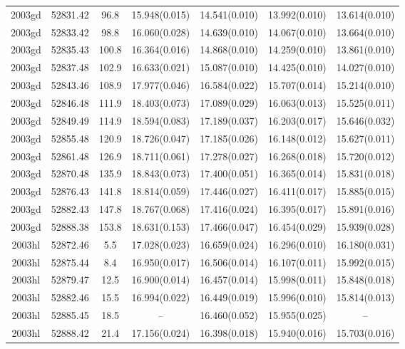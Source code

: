 \begin{table*}
\begin{tabular}{ccccccc}
2003gd	  & 52831.42	 & 96.8	& 15.948(0.015)	 & 14.541(0.010)	 & 13.992(0.010)	 & 13.614(0.010) \\ 
2003gd	  & 52833.42	 & 98.8	& 16.060(0.028)	 & 14.639(0.010)	 & 14.067(0.010)	 & 13.664(0.010) \\ 
2003gd	  & 52835.43	 & 100.8	& 16.364(0.016)	 & 14.868(0.010)	 & 14.259(0.010)	 & 13.861(0.010) \\ 
2003gd	  & 52837.48	 & 102.9	& 16.633(0.021)	 & 15.087(0.010)	 & 14.425(0.010)	 & 14.027(0.010) \\ 
2003gd	  & 52843.46	 & 108.9	& 17.977(0.046)	 & 16.584(0.022)	 & 15.707(0.014)	 & 15.214(0.010) \\ 
2003gd	  & 52846.48	 & 111.9	& 18.403(0.073)	 & 17.089(0.029)	 & 16.063(0.013)	 & 15.525(0.011) \\ 
2003gd	  & 52849.49	 & 114.9	& 18.594(0.083)	 & 17.189(0.037)	 & 16.203(0.017)	 & 15.646(0.032) \\ 
2003gd	  & 52855.48	 & 120.9	& 18.726(0.047)	 & 17.185(0.026)	 & 16.148(0.012)	 & 15.627(0.011) \\ 
2003gd	  & 52861.48	 & 126.9	& 18.711(0.061)	 & 17.278(0.027)	 & 16.268(0.018)	 & 15.720(0.012) \\ 
2003gd	  & 52870.48	 & 135.9	& 18.843(0.073)	 & 17.400(0.051)	 & 16.365(0.014)	 & 15.831(0.018) \\ 
2003gd	  & 52876.43	 & 141.8	& 18.814(0.059)	 & 17.446(0.027)	 & 16.411(0.017)	 & 15.885(0.015) \\ 
2003gd	  & 52882.43	 & 147.8	& 18.767(0.068)	 & 17.416(0.024)	 & 16.395(0.017)	 & 15.891(0.016) \\ 
2003gd	  & 52888.38	 & 153.8	& 18.631(0.153)	 & 17.466(0.047)	 & 16.454(0.029)	 & 15.939(0.028) \\ 
2003hl	  & 52872.46	 & 5.5	& 17.028(0.023)	 & 16.659(0.024)	 & 16.296(0.010)	 & 16.180(0.031) \\ 
2003hl	  & 52875.44	 & 8.4	& 16.950(0.017)	 & 16.506(0.014)	 & 16.107(0.011)	 & 15.992(0.015) \\ 
2003hl	  & 52879.47	 & 12.5	& 16.900(0.014)	 & 16.457(0.014)	 & 15.998(0.011)	 & 15.848(0.018) \\ 
2003hl	  & 52882.46	 & 15.5	& 16.994(0.022)	 & 16.449(0.019)	 & 15.996(0.010)	 & 15.814(0.013) \\ 
2003hl	  & 52885.45	 & 18.5	& --	 & 16.460(0.052)	 & 15.955(0.025)	 & -- \\ 
2003hl	  & 52888.42	 & 21.4	& 17.156(0.024)	 & 16.398(0.018)	 & 15.940(0.016)	 & 15.703(0.016) \\ 

\end{tabular}
\end{table*}
